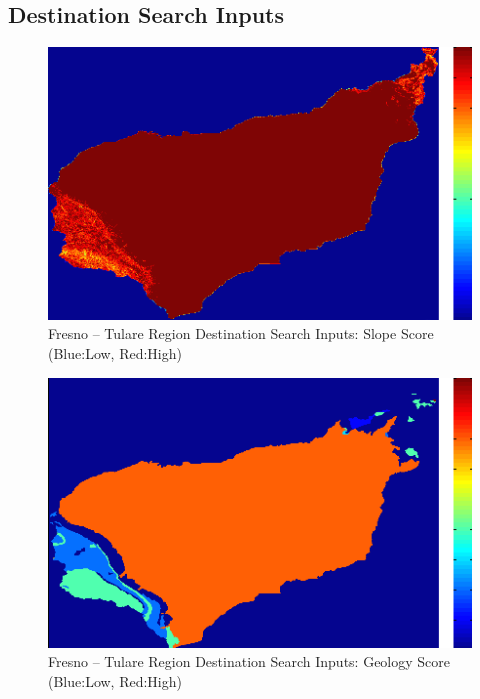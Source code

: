     \subsection{Destination Search Inputs}
    
        \begin{figure}[!h]
            \begin{center}
            \includegraphics[width=5.5in]{figures/Fresno_Search_Slope.png}   
            \caption{Fresno -- Tulare Region Destination Search Inputs: Slope Score (Blue:Low, Red:High)}
            \label{fig:Fdsinputs_slope}
            \end{center}
        \end{figure}
        
        \begin{figure}[!h]
            \begin{center}
            \includegraphics[width=5.5in]{figures/Fresno_Search_Geology.png}   
            \caption{Fresno -- Tulare Region Destination Search Inputs: Geology Score (Blue:Low, Red:High)}
            \label{fig:Fdsinputs_geology}
            \end{center}
        \end{figure}
    
